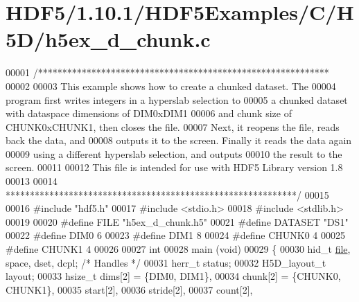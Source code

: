 \hypertarget{_h_d_f5_21_810_81_2_h_d_f5_examples_2_c_2_h5_d_2h5ex__d__chunk_8c_source}{}\section{H\+D\+F5/1.10.1/\+H\+D\+F5\+Examples/\+C/\+H5\+D/h5ex\+\_\+d\+\_\+chunk.c}
\label{_h_d_f5_21_810_81_2_h_d_f5_examples_2_c_2_h5_d_2h5ex__d__chunk_8c_source}

\begin{DoxyCode}
00001 \textcolor{comment}{/************************************************************}
00002 \textcolor{comment}{}
00003 \textcolor{comment}{  This example shows how to create a chunked dataset.  The}
00004 \textcolor{comment}{  program first writes integers in a hyperslab selection to}
00005 \textcolor{comment}{  a chunked dataset with dataspace dimensions of DIM0xDIM1}
00006 \textcolor{comment}{  and chunk size of CHUNK0xCHUNK1, then closes the file.}
00007 \textcolor{comment}{  Next, it reopens the file, reads back the data, and}
00008 \textcolor{comment}{  outputs it to the screen.  Finally it reads the data again}
00009 \textcolor{comment}{  using a different hyperslab selection, and outputs}
00010 \textcolor{comment}{  the result to the screen.}
00011 \textcolor{comment}{}
00012 \textcolor{comment}{  This file is intended for use with HDF5 Library version 1.8}
00013 \textcolor{comment}{}
00014 \textcolor{comment}{ ************************************************************/}
00015 
00016 \textcolor{preprocessor}{#include "hdf5.h"}
00017 \textcolor{preprocessor}{#include <stdio.h>}
00018 \textcolor{preprocessor}{#include <stdlib.h>}
00019 
00020 \textcolor{preprocessor}{#define FILE            "h5ex\_d\_chunk.h5"}
00021 \textcolor{preprocessor}{#define DATASET         "DS1"}
00022 \textcolor{preprocessor}{#define DIM0            6}
00023 \textcolor{preprocessor}{#define DIM1            8}
00024 \textcolor{preprocessor}{#define CHUNK0          4}
00025 \textcolor{preprocessor}{#define CHUNK1          4}
00026 
00027 \textcolor{keywordtype}{int}
00028 main (\textcolor{keywordtype}{void})
00029 \{
00030     hid\_t           \hyperlink{structfile}{file}, space, dset, dcpl;    \textcolor{comment}{/* Handles */}
00031     herr\_t          status;
00032     H5D\_layout\_t    layout;
00033     hsize\_t         dims[2] = \{DIM0, DIM1\},
00034                     chunk[2] = \{CHUNK0, CHUNK1\},
00035                     start[2],
00036                     stride[2],
00037                     count[2],

\end{DoxyCode}

